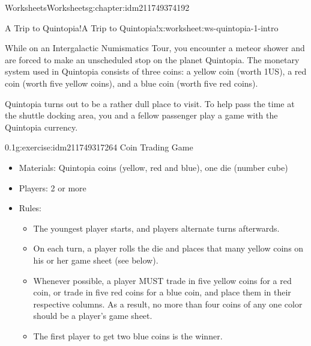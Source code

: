 \documentclass[twoside,11pt,]{book}
\begin{document}
\begin{chapterptx}{Worksheets}{}{Worksheets}{}{}{g:chapter:idm211749374192}
%
%
\typeout{************************************************}
\typeout{************************************************}
%
\begin{worksheet-section-numberless}{A Trip to Quintopia!}{}{A Trip to Quintopia!}{}{}{x:worksheet:ws-quintopia-1-intro}
\begin{introduction}{}%
While on an Intergalactic Numismatics Tour, you encounter a meteor shower and are forced to make an unscheduled stop on the planet Quintopia.  The monetary system used in Quintopia consists of three coins:  a yellow coin (worth \textdollar{}1US), a red coin (worth five yellow coins), and a blue coin (worth five red coins).%
\par
Quintopia turns out to be a rather dull place to visit.  To help pass the time at the shuttle docking area, you and a fellow passenger play a game with the Quintopia currency.%
\end{introduction}%
\begin{divisionexercise}{1}{}{0.1}{g:exercise:idm211749317264}%
Coin Trading Game%
%
\begin{itemize}[label=\textbullet]
\item{}Materials:  Quintopia coins (yellow, red and blue), one die (number cube)%
\item{}Players:  2 or more%
\item{}Rules:%
\begin{itemize}[label=$\circ$]
\item{}The youngest player starts, and players alternate turns afterwards.%
\item{}On each turn, a player rolls the die and places that many yellow coins on his or her game sheet (see below).%
\item{}Whenever possible, a player MUST trade in five yellow coins for a red coin, or trade in five red coins for a blue coin, and place them in their respective columns.  As a result, no more than four coins of any one color should be a player’s game sheet.%
\item{}The first player to get two blue coins is the winner.%
\end{itemize}
%
\end{itemize}
\begin{sidebyside}{1}{0}{0}{0}%
\begin{sbspanel}{1}%

\end{sbspanel}
\end{sidebyside}
\end{divisionexercise}
\end{worksheet-section-numberless}
\end{chapterptx}
\end{document}
